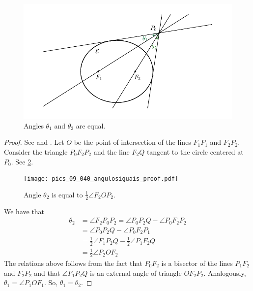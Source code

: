 \begin{figure}
	\begin{center}
 \includegraphics[scale=0.9]{pics_tex/angulo_corda.pdf}
		\caption {Angles $\theta_1$ and $\theta_2$ are equal. 	\label{fig:angulocorda} }
	\end{center}

\end{figure}

 \begin{proof} See \cite{melrose1979} and \cite{akopyan2007-conics}.
Let $O$ be the point of intersection of the lines $F_1P_1$ and $F_2P_2.$
Consider the triangle $P_0F_2P_2$ and the line $F_2Q$ tangent to the circle centered at $P_0.$ See \cref{fig:angulosiguaisproof}.


\begin{figure}
	\begin{center}
 \texttt{[image: pics\_09\_040\_angulosiguais\_proof.pdf]}
		\caption {Angle   $\theta_2$ is equal to  $\frac{1}{2}\angle F_2OP_2$.	\label{fig:angulosiguaisproof} }
	\end{center}

\end{figure}

We have that
\begin{align*}
    \theta_2&=\angle F_2P_0P_2=\angle P_0P_2Q-\angle P_0F_2P_2\\ 
    &= \angle P_0P_2Q-\angle P_0F_2P_1\\
    &=\frac{1}{2}\angle F_1P_2Q -\frac{1}{2} \angle P_1F_2Q\\
    &=
    \frac{1}{2} \angle P_2OF_2
 \end{align*}
 The relations above follows from the fact that $P_0F_2$ is a bisector of the lines $P_1F_2$ and $F_2P_2$ and   that  $\angle F_1P_2Q$ is an external angle of triangle $OF_2P_2.$
 Analogously, $\theta_1=\angle P_1OF_1$. So, $\theta_1=\theta_2.$
\end{proof}

